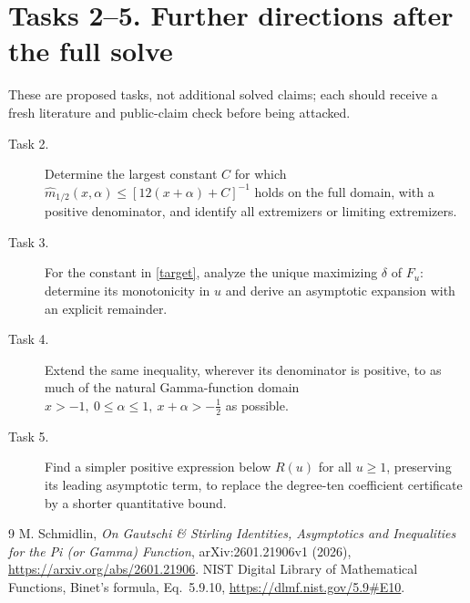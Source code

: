 \documentclass[11pt]{article}
\begin{document}
\section*{Tasks 2--5. Further directions after the full solve}
These are proposed tasks, not additional solved claims; each should
receive a fresh literature and public-claim check before being attacked.
\begin{description}
\item[Task 2.] Determine the largest constant \(C\) for which
\(\widehat m_{1/2}(x,\alpha)\leq[12(x+\alpha)+C]^{-1}\)
holds on the full domain, with a positive denominator, and identify
all extremizers or limiting extremizers.
\item[Task 3.] For the constant in \eqref{target}, analyze the unique
maximizing \(\delta\) of \(F_u\): determine its monotonicity in \(u\)
and derive an asymptotic expansion with an explicit remainder.
\item[Task 4.] Extend the same inequality, wherever its denominator is
positive, to as much of the natural Gamma-function domain
\(x>-1,\ 0\leq\alpha\leq1,\ x+\alpha>-\tfrac12\) as possible.
\item[Task 5.] Find a simpler positive expression below \(R(u)\) for
all \(u\geq1\), preserving its leading asymptotic term, to replace
the degree-ten coefficient certificate by a shorter quantitative bound.
\end{description}

\begin{thebibliography}{9}
M. Schmidlin, \emph{On Gautschi \& Stirling Identities, Asymptotics
and Inequalities for the Pi (or Gamma) Function},
arXiv:2601.21906v1 (2026),
\url{https://arxiv.org/abs/2601.21906}.
NIST Digital Library of Mathematical Functions,
Binet's formula, Eq.~5.9.10,
\url{https://dlmf.nist.gov/5.9#E10}.
\end{thebibliography}
\end{document}
